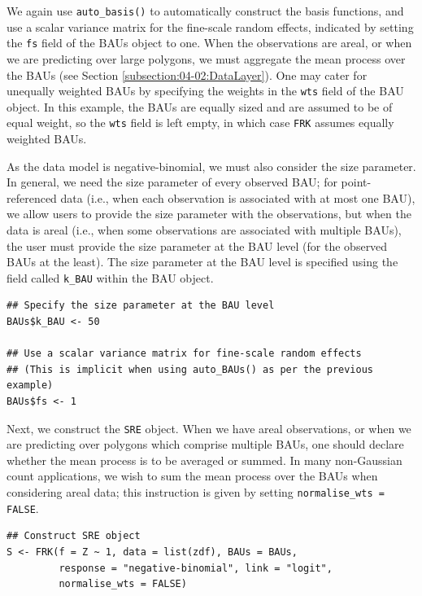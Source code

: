 \documentclass[12pt,a4paper]{article}
\begin{document}
We again use \texttt{auto\_basis()} to automatically construct the basis functions, and use a scalar  variance matrix for the fine-scale random effects, indicated by setting the \texttt{fs} field of the BAUs object to one. 
When the observations are areal, or when we are predicting over large polygons, we must aggregate the mean process over the BAUs (see Section \ref{subsection:04-02:DataLayer}).
One may cater for unequally weighted BAUs by specifying the weights in the \texttt{wts} field of the BAU object. 
In this example, the BAUs are equally sized and are assumed to be of equal weight, so the \texttt{wts} field is left empty, in which case \texttt{FRK} assumes equally weighted BAUs.


As the data model is negative-binomial, we must also consider the size parameter. 
In general, we need the size parameter of every observed BAU; for point-referenced data (i.e., when each observation is associated with at most one BAU), we allow users to provide the size parameter with the observations, but when the data is areal (i.e., when some observations are associated with multiple BAUs), the user must provide the size parameter at the BAU level (for the observed BAUs at the least).
The size parameter at the BAU level is specified using the field called \texttt{k\_BAU} within the BAU object.


\begin{minipage}{\linewidth}
\begin{lstlisting}[style=R]
## Specify the size parameter at the BAU level
BAUs$k_BAU <- 50

## Use a scalar variance matrix for fine-scale random effects
## (This is implicit when using auto_BAUs() as per the previous example)
BAUs$fs <- 1 
\end{lstlisting}
\end{minipage}


Next, we construct the \texttt{SRE} object. 
When we have areal observations, or when we are predicting over polygons which comprise multiple BAUs, one should declare whether the mean process is to be averaged or summed. 
In many non-Gaussian count applications, we wish to sum the mean process over the BAUs when considering areal data; this instruction is given by setting \texttt{normalise\_wts = FALSE}.


\begin{minipage}{\linewidth}
\begin{lstlisting}[style=R]
## Construct SRE object
S <- FRK(f = Z ~ 1, data = list(zdf), BAUs = BAUs, 
         response = "negative-binomial", link = "logit", 
         normalise_wts = FALSE)
\end{lstlisting}
\end{minipage}
\end{document}
